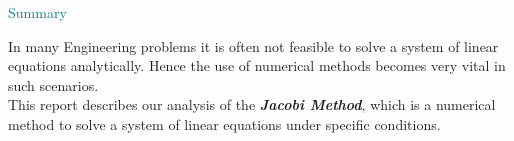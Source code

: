 \documentclass[main.tex]{subfiles}
\begin{document}
\vspace*{\fill}

{\Huge \textcolor{teal}{Summary}\\}

    In many Engineering problems it is often not feasible to solve a system of linear 
    equations analytically. Hence the use of numerical methods becomes very vital in such scenarios.\vspace{0.5mm}\\ 
    
    This report describes our analysis of the \textbf{\textit{\color{teal} Jacobi Method}}, which is a numerical method to solve 
    a system of linear equations under specific conditions.
\vspace*{\fill}
    
\clearpage
\end{document}
